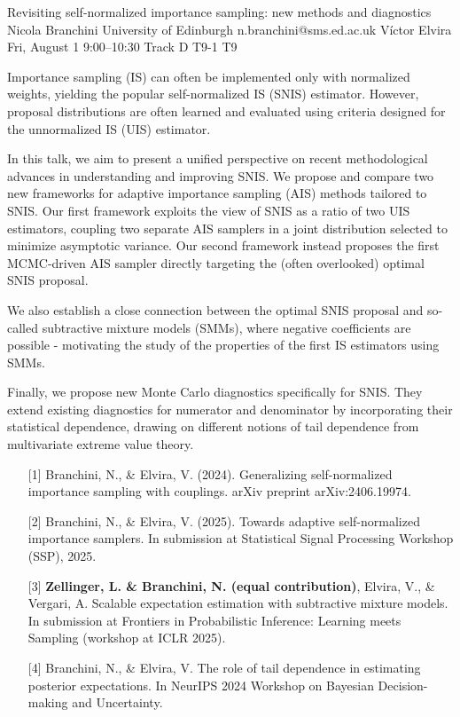 \begin{talk}
  {Revisiting self-normalized importance sampling: new methods and diagnostics}%
  {Nicola Branchini}%
  {University of Edinburgh}%
  {n.branchini@sms.ed.ac.uk}%
  {Víctor Elvira}%
  {}%
  {Fri, August 1 9:00–10:30 Track D}%
  {T9-1}%
  {T9}%
			
Importance sampling (IS) can often be implemented only with normalized weights, yielding the popular self-normalized IS (SNIS) estimator. However, proposal distributions are often learned and evaluated using criteria designed for the unnormalized IS (UIS) estimator.

In this talk, we aim to present a unified perspective on recent methodological advances in understanding and improving SNIS.
We propose and compare two new frameworks for adaptive importance sampling (AIS) methods tailored to SNIS. Our first framework exploits the view of SNIS as a ratio of two UIS estimators, coupling two separate AIS samplers in a joint distribution selected to minimize asymptotic variance. Our second framework instead proposes the first MCMC-driven AIS sampler directly targeting the (often overlooked) optimal SNIS proposal.

We also establish a close connection between the optimal SNIS proposal and so-called subtractive mixture models (SMMs), where negative coefficients are possible - motivating the study of the properties of the first IS estimators using SMMs.

Finally, we propose new Monte Carlo diagnostics specifically for SNIS. They extend existing diagnostics for numerator and denominator by incorporating their statistical dependence, drawing on different notions of tail dependence from multivariate extreme value theory.

\medskip

\begin{enumerate}
	\item[{[1]}] Branchini, N., \& Elvira, V. (2024). Generalizing self-normalized importance sampling with couplings. arXiv preprint arXiv:2406.19974.
	\item[{[2]}] Branchini, N., \& Elvira, V. (2025). Towards adaptive self-normalized importance samplers. In submission at Statistical Signal Processing Workshop (SSP), 2025.
    \item[{[3]}] \textbf{Zellinger, L. \& Branchini, N. (equal contribution)}, Elvira, V., \& Vergari, A. Scalable expectation estimation with subtractive mixture models. In submission at Frontiers in Probabilistic Inference: Learning meets Sampling (workshop at ICLR 2025).
    \item[{[4]}] Branchini, N., \& Elvira, V. The role of tail dependence in estimating posterior expectations. In NeurIPS 2024 Workshop on Bayesian Decision-making and Uncertainty.


\end{enumerate}

\end{talk}
